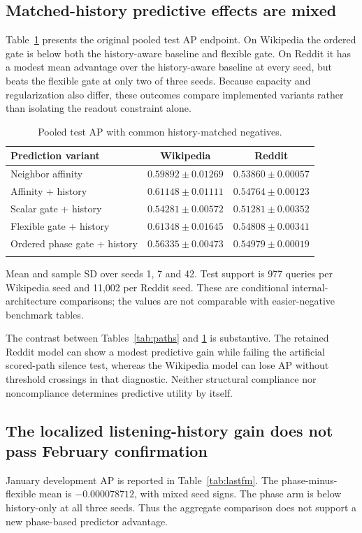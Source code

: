 \documentclass[pdflatex,sn-vancouver-num]{sn-jnl}
\theoremstyle{thmstyleone}
\begin{document}
\subsection{Matched-history predictive effects are mixed}
Table~\ref{tab:prediction} presents the original pooled test AP endpoint. On Wikipedia the ordered gate is below both the history-aware baseline and flexible gate. On Reddit it has a modest mean advantage over the history-aware baseline at every seed, but beats the flexible gate at only two of three seeds. Because capacity and regularization also differ, these outcomes compare implemented variants rather than isolating the readout constraint alone.

\begin{table}[t]
\caption{Pooled test AP with common history-matched negatives.}\label{tab:prediction}
\centering
\begin{tabular}{@{}lcc@{}}
\toprule
Prediction variant & Wikipedia & Reddit \\
\midrule
Neighbor affinity & $0.59892\pm0.01269$ & $0.53860\pm0.00057$ \\
Affinity + history & $0.61148\pm0.01111$ & $0.54764\pm0.00123$ \\
Scalar gate + history & $0.54281\pm0.00572$ & $0.51281\pm0.00352$ \\
Flexible gate + history & $0.61348\pm0.01645$ & $0.54808\pm0.00341$ \\
Ordered phase gate + history & $0.56335\pm0.00473$ & $0.54979\pm0.00019$ \\
\botrule
\end{tabular}
\begin{tablenotes}[flushleft]\footnotesize\item Mean and sample SD over seeds 1, 7 and 42. Test support is 977 queries per Wikipedia seed and 11,002 per Reddit seed. These are conditional internal-architecture comparisons; the values are not comparable with easier-negative benchmark tables.\end{tablenotes}
\end{table}

The contrast between Tables~\ref{tab:paths} and \ref{tab:prediction} is substantive. The retained Reddit model can show a modest predictive gain while failing the artificial scored-path silence test, whereas the Wikipedia model can lose AP without threshold crossings in that diagnostic. Neither structural compliance nor noncompliance determines predictive utility by itself.

\subsection{The localized listening-history gain does not pass February confirmation}
January development AP is reported in Table~\ref{tab:lastfm}. The phase-minus-flexible mean is $-0.000078712$, with mixed seed signs. The phase arm is below history-only at all three seeds. Thus the aggregate comparison does not support a new phase-based predictor advantage.
\end{document}
